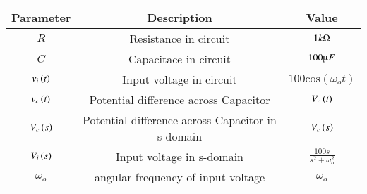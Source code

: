 \begin{tabular}{|c|c|c|}
    \hline
    \textbf{Parameter} & \textbf{Description} & \textbf{Value} \\
    \hline
    $R$ & Resistance in circuit & $ 1k\ohm$ \\
    \hline
    $C$ & Capacitace in circuit & $ 100\micro F$ \\
    \hline
    $v_i\left(t\right)$ & Input voltage in circuit & $ 100\text{cos}(\omega_o t)$ \\
    \hline
    $v_c\left(t\right)$ & Potential difference across Capacitor& $V_c\left(t\right)$ \\
    \hline
    $V_c\left(s\right)$ & Potential difference across Capacitor in s-domain& $V_c\left(s\right)$ \\
    \hline
    $V_i\left(s\right)$ & Input voltage in s-domain& $ \frac{100s}{s^2+ \omega_o^2}$\\
    \hline
    $\omega_o$ & angular frequency of input voltage& $ \omega_o$\\
    \hline
\end{tabular}



